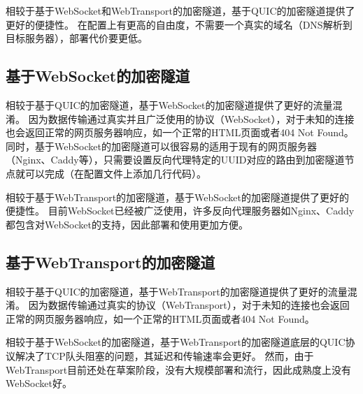 相较于基于WebSocket和WebTransport的加密隧道，基于QUIC的加密隧道提供了更好的便捷性。
在配置上有更高的自由度，不需要一个真实的域名（DNS解析到目标服务器），部署代价要更低。

\subsection{基于WebSocket的加密隧道}
相较于基于QUIC的加密隧道，基于WebSocket的加密隧道提供了更好的流量混淆。
因为数据传输通过真实并且广泛使用的协议（WebSocket），对于未知的连接也会返回正常的网页服务器响应，如一个正常的HTML页面或者404 Not Found。
同时，基于WebSocket的加密隧道可以很容易的适用于现有的网页服务器（Nginx、Caddy等），只需要设置反向代理特定的UUID对应的路由到加密隧道节点就可以完成（在配置文件上添加几行代码）。

相较于基于WebTransport的加密隧道，基于WebSocket的加密隧道提供了更好的便捷性。
目前WebSocket已经被广泛使用，许多反向代理服务器如Nginx、Caddy都包含对WebSocket的支持，因此部署和使用更加方便。

\subsection{基于WebTransport的加密隧道}
相较于基于QUIC的加密隧道，基于WebTransport的加密隧道提供了更好的流量混淆。
因为数据传输通过真实的协议（WebTransport），对于未知的连接也会返回正常的网页服务器响应，如一个正常的HTML页面或者404 Not Found。

相较于基于WebSocket的加密隧道，基于WebTransport的加密隧道底层的QUIC协议解决了TCP队头阻塞的问题，其延迟和传输速率会更好。
然而，由于WebTransport目前还处在草案阶段，没有大规模部署和流行，因此成熟度上没有WebSocket好。
